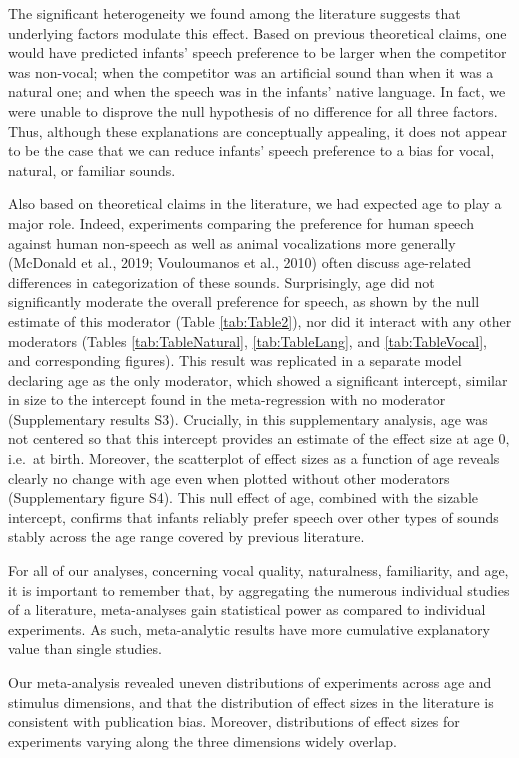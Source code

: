 \documentclass[
  man,mask,floatsintext]{apa6}
\begin{document}
The significant heterogeneity we found among the literature suggests that underlying factors modulate this effect. Based on previous theoretical claims, one would have predicted infants' speech preference to be larger when the competitor was non-vocal; when the competitor was an artificial sound than when it was a natural one; and when the speech was in the infants' native language. In fact, we were unable to disprove the null hypothesis of no difference for all three factors. Thus, although these explanations are conceptually appealing, it does not appear to be the case that we can reduce infants' speech preference to a bias for vocal, natural, or familiar sounds.

Also based on theoretical claims in the literature, we had expected age to play a major role. Indeed, experiments comparing the preference for human speech against human non-speech as well as animal vocalizations more generally (McDonald et al., 2019; Vouloumanos et al., 2010) often discuss age-related differences in categorization of these sounds. Surprisingly, age did not significantly moderate the overall preference for speech, as shown by the null estimate of this moderator (Table \ref{tab:Table2}), nor did it interact with any other moderators (Tables \ref{tab:TableNatural}, \ref{tab:TableLang}, and \ref{tab:TableVocal}, and corresponding figures). This result was replicated in a separate model declaring age as the only moderator, which showed a significant intercept, similar in size to the intercept found in the meta-regression with no moderator (Supplementary results S3).
Crucially, in this supplementary analysis, age was not centered so that this intercept provides an estimate of the effect size at age 0, i.e.~at birth.
Moreover, the scatterplot of effect sizes as a function of age reveals clearly no change with age even when plotted without other moderators (Supplementary figure S4). This null effect of age, combined with the sizable intercept, confirms that infants reliably prefer speech over other types of sounds stably across the age range covered by previous literature.

For all of our analyses, concerning vocal quality, naturalness, familiarity, and age, it is important to remember that, by aggregating the numerous individual studies of a literature, meta-analyses gain statistical power as compared to individual experiments. As such, meta-analytic results have more cumulative explanatory value than single studies.

Our meta-analysis revealed uneven distributions of experiments across age and stimulus dimensions, and that the distribution of effect sizes in the literature is consistent with publication bias. Moreover, distributions of effect sizes for experiments varying along the three dimensions widely overlap.
\end{document}
